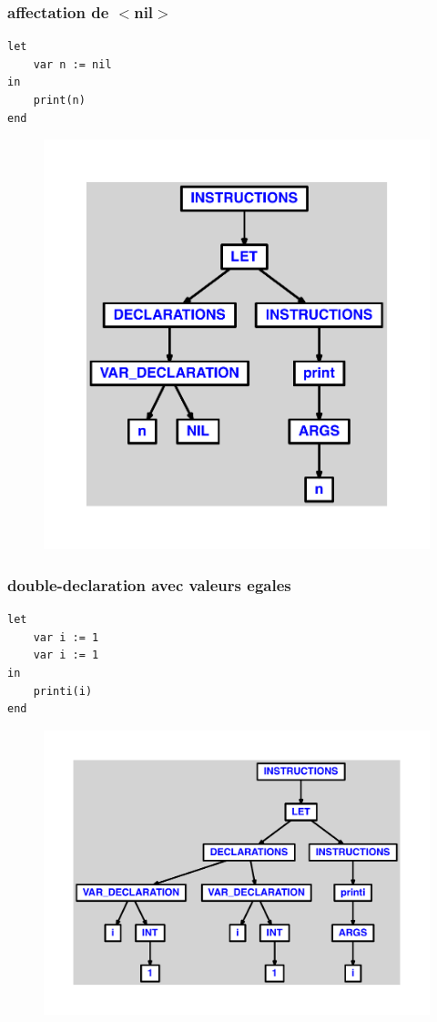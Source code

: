 \documentclass{article}
\begin{document}
\subsubsection{affectation de $ < $nil$ > $}
\begin{lstlisting}
let
	var n := nil
in
	print(n)
end
\end{lstlisting}
\newpage
\begin{figure}[H]
\centering
\includegraphics[max width=\textwidth]{ast/ast_293.pdf}
\end{figure}
\newpage
\subsubsection{double-declaration avec valeurs egales}
\begin{lstlisting}
let
	var i := 1
	var i := 1
in
	printi(i)
end
\end{lstlisting}
\newpage
\begin{figure}[H]
\centering
\includegraphics[max width=\textwidth]{ast/ast_294.pdf}
\end{figure}
\newpage
\end{document}

